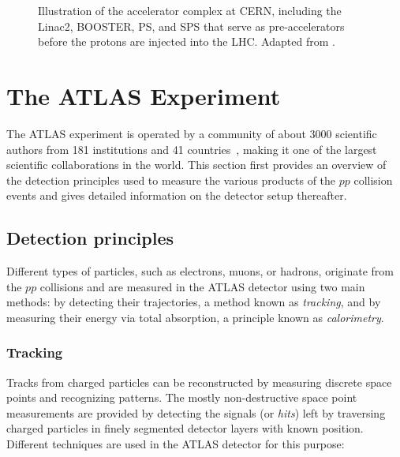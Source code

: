 \FloatBarrier





\begin{figure}
    \caption[Illustration of the accelerator complex at CERN.]{Illustration of the accelerator complex at CERN, including the Linac2, BOOSTER, PS, and SPS that serve as pre-accelerators before the protons are injected into the LHC. Adapted from .}
    \label{fig:accelerator-complex}
\end{figure}







\section{The ATLAS Experiment}
The ATLAS experiment is operated by a community of about 3000 scientific authors from 181 institutions and 41 countries~\cite{AtlasCollab}, making it one of the largest scientific collaborations in the world.
This section first provides an overview of the detection principles used to measure the various products of the $pp$ collision events and gives detailed information on the detector setup thereafter.

\subsection{Detection principles}
\label{subsec:measurement-principles}
Different types of particles, such as electrons, muons, or hadrons, originate from the $pp$ collisions and are measured in the ATLAS detector using two main methods: by detecting their trajectories, a method known as \emph{tracking}, and by measuring their energy via total absorption, a principle known as \emph{calorimetry}.

\subsubsection{Tracking}
Tracks from charged particles can be reconstructed by measuring discrete space points and recognizing patterns.
The mostly non-destructive space point measurements are provided by detecting the signals (or \emph{hits}) left by traversing charged particles in finely segmented detector layers with known position. Different techniques are used in the ATLAS detector for this purpose:
